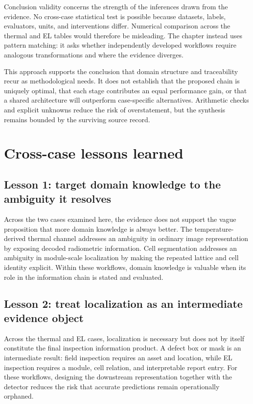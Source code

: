\documentclass[12pt,a4paper]{report}
\begin{document}
Conclusion validity concerns the strength of the inferences drawn from the evidence. No cross-case statistical test is possible because datasets, labels, evaluators, units, and interventions differ. Numerical comparison across the thermal and EL tables would therefore be misleading. The chapter instead uses pattern matching: it asks whether independently developed workflows require analogous transformations and where the evidence diverges.

This approach supports the conclusion that domain structure and traceability recur as methodological needs. It does not establish that the proposed chain is uniquely optimal, that each stage contributes an equal performance gain, or that a shared architecture will outperform case-specific alternatives. Arithmetic checks and explicit unknowns reduce the risk of overstatement, but the synthesis remains bounded by the surviving source record.

\section{Cross-case lessons learned}
\label{sec:ch07-lessons}

\subsection{Lesson 1: target domain knowledge to the ambiguity it resolves}

Across the two cases examined here, the evidence does not support the vague proposition that more domain knowledge is always better. The temperature-derived thermal channel addresses an ambiguity in ordinary image representation by exposing decoded radiometric information. Cell segmentation addresses an ambiguity in module-scale localization by making the repeated lattice and cell identity explicit. Within these workflows, domain knowledge is valuable when its role in the information chain is stated and evaluated.

\subsection{Lesson 2: treat localization as an intermediate evidence object}

Across the thermal and EL cases, localization is necessary but does not by itself constitute the final inspection information product. A defect box or mask is an intermediate result: field inspection requires an asset and location, while EL inspection requires a module, cell relation, and interpretable report entry. For these workflows, designing the downstream representation together with the detector reduces the risk that accurate predictions remain operationally orphaned.
\end{document}
